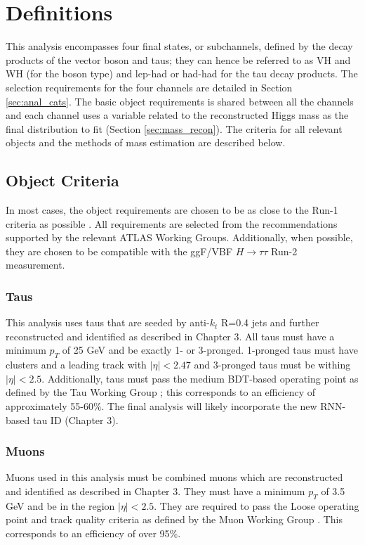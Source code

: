 \section{Definitions}
This analysis encompasses four final states, or subchannels, defined by the decay products of the vector boson and taus; they can hence be referred to as VH and WH (for the boson type) and lep-had or had-had for the tau decay products. The selection requirements for the four channels are detailed in Section \ref{sec:anal_cats}. The basic object requirements is shared between all the channels and each channel uses a variable related to the reconstructed Higgs mass as the final distribution to fit (Section \ref{sec:mass_recon}). The criteria for all relevant objects and the methods of mass estimation are described below. 

\subsection{Object Criteria}
In most cases, the object requirements are chosen to be as close to the Run-1 criteria as possible \cite{vh_run1_note}. All requirements are selected from the recommendations supported by the relevant ATLAS Working Groups. Additionally, when possible, they are chosen to be compatible with the ggF/VBF $H\rightarrow\tau\tau$ Run-2 measurement. 

\subsubsection{Taus}
This analysis uses taus that are seeded by anti-$k_t$ R=0.4 jets and further reconstructed and identified as described in Chapter 3. All taus must have a minimum $p_T$ of 25 GeV and be exactly 1- or 3-pronged. 1-pronged taus must have clusters and a leading track with $|\eta|<2.47$ and 3-pronged taus must be withing $|\eta|<2.5$. Additionally, taus must pass the medium BDT-based operating point as defined by the Tau Working Group \cite{tau_cp}; this corresponds to an efficiency of approximately 55-60\%. The final analysis will likely incorporate the new RNN-based tau ID (Chapter 3).

\subsubsection{Muons}
Muons used in this analysis must be combined muons which are reconstructed and identified as described in Chapter 3. They must have a minimum $p_T$ of 3.5 GeV and be in the region $|\eta|<2.5$. They are required to pass the Loose operating point and track quality criteria as defined by the Muon Working Group \cite{muon_cp}. This corresponds to an efficiency of over 95\%.

